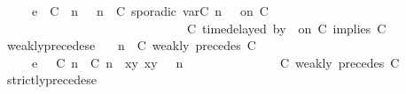 \begin{isabellebody}
\ \ \ \ \ {\isasymhookrightarrow}\isactrlsub e\ \ {\isacharparenleft}{\isacharparenleft}{\isacharparenleft}C\ {\isasymUp}\ n{\isacharparenright}\ {\isacharhash}\ {\isasymGamma}{\isacharparenright}{\isacharcomma}\ n\ {\isasymturnstile}\ {\isacharparenleft}{\isacharparenleft}C\ sporadic{\isasymsharp}\ {\isasymlparr}{\isasymtau}\isactrlsub v\isactrlsub a\isactrlsub r{\isacharparenleft}C\ n{\isacharparenright}\ {\isasymoplus}\ {\isasymdelta}{\isasymtau}{\isasymrparr}\ on\ C\ {\isacharhash}\ {\isasymPsi}{\isacharparenright}\isanewline
\ \ \ \ \ \ \ \ \ \ \ \ \ \ \ \ \ \ \ \ \ \ \ \ \ \ \ \ \ {\isasymtriangleright}\ {\isacharparenleft}{\isacharparenleft}C\ time{\isacharminus}delayed{\isasymbowtie}\ by\ {\isasymdelta}{\isasymtau}\ on\ C\ implies\ C\ {\isacharhash}\ {\isasymPhi}{\isacharparenright}{\isacharparenright}{\isacartoucheclose}\isanewline
{\isacharbar}\ weakly{\isacharunderscore}precedes{\isacharunderscore}e{\isacharcolon}\isanewline
%
\isanewline
\ \ {\isacartoucheopen}{\isacharparenleft}{\isasymGamma}{\isacharcomma}\ n\ {\isasymturnstile}\ {\isacharparenleft}{\isacharparenleft}C\ weakly\ precedes\ C\ {\isacharhash}\ {\isasymPsi}{\isacharparenright}\ {\isasymtriangleright}\ {\isasymPhi}{\isacharparenright}\isanewline
\ \ \ \ \ {\isasymhookrightarrow}\isactrlsub e\ \ {\isacharparenleft}{\isacharparenleft}{\isacharparenleft}{\isasymlceil}{\isacharhash}\isactrlsup {\isasymle}\ C\ n{\isacharcomma}\ {\isacharhash}\isactrlsup {\isasymle}\ C\ n{\isasymrceil}\ {\isasymin}\ {\isacharparenleft}{\isasymlambda}{\isacharparenleft}x{\isacharcomma}y{\isacharparenright}{\isachardot}\ x{\isasymle}y{\isacharparenright}{\isacharparenright}\ {\isacharhash}\ {\isasymGamma}{\isacharparenright}{\isacharcomma}\ n\isanewline
\ \ \ \ \ \ \ \ \ \ \ \ {\isasymturnstile}\ {\isasymPsi}\ {\isasymtriangleright}\ {\isacharparenleft}{\isacharparenleft}C\ weakly\ precedes\ C\ {\isacharhash}\ {\isasymPhi}{\isacharparenright}{\isacharparenright}{\isacartoucheclose}\isanewline
{\isacharbar}\ strictly{\isacharunderscore}precedes{\isacharunderscore}e{\isacharcolon}\isanewline
%
\end{isabellebody}
